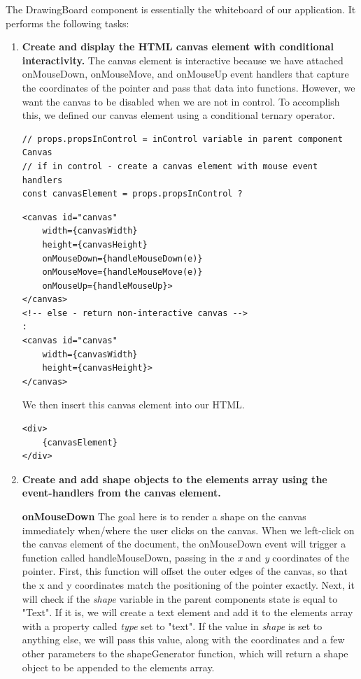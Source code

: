 The DrawingBoard component is essentially the whiteboard of our application. It performs the following tasks:
\begin{enumerate}
    \item \textbf{Create and display the HTML canvas element with conditional interactivity.} \newline 
    The canvas element is interactive because we have attached onMouseDown, onMouseMove, and onMouseUp event handlers that capture the coordinates of the pointer and pass that data into functions. However, we want the canvas to be disabled when we are not in control. To accomplish this, we defined our canvas element using a conditional ternary operator. 
    \begin{verbatim}
// props.propsInControl = inControl variable in parent component Canvas 
// if in control - create a canvas element with mouse event handlers
const canvasElement = props.propsInControl ?
    \end{verbatim}
    \begin{verbatim}
<canvas id="canvas"
    width={canvasWidth}
    height={canvasHeight}
    onMouseDown={handleMouseDown(e)}
    onMouseMove={handleMouseMove(e)}
    onMouseUp={handleMouseUp}>
</canvas>
<!-- else - return non-interactive canvas -->
:
<canvas id="canvas"
    width={canvasWidth}
    height={canvasHeight}>
</canvas> 
    \end{verbatim}

    We then insert this canvas element into our HTML. 

    \begin{verbatim}
<div>
    {canvasElement}
</div>
    \end{verbatim}

    \item \textbf{Create and add shape objects to the elements array using the event-handlers from the canvas element.} 
    
    \textbf{onMouseDown} \newline 
    The goal here is to render a shape on the canvas immediately when/where the user clicks on the canvas. \newline When we left-click on the canvas element of the document, the onMouseDown event will trigger a function called handleMouseDown, passing in the \textit{x} and \textit{y} coordinates of the pointer. First, this function will offset the outer edges of the canvas, so that the x and y coordinates match the positioning of the pointer exactly. Next, it will check if the \textit{shape} variable in the parent components state is equal to "Text". If it is, we will create a text element and add it to the elements array with a property called \textit{type} set to "text". If the value in \textit{shape} is set to anything else, we will pass this value, along with the coordinates and a few other parameters to the shapeGenerator function, which will return a shape object to be appended to the elements array. 
    

\end{enumerate}
